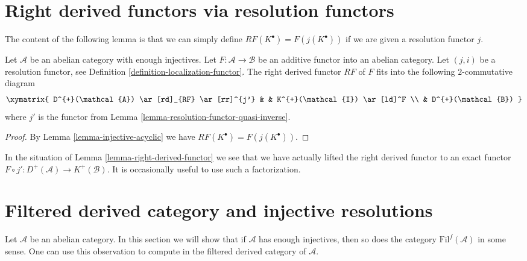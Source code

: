 \section{Right derived functors via resolution functors}
\label{section-right-derived-functor-via-resolutions}

\noindent
The content of the following lemma is that we can simply define
$RF(K^\bullet) = F(j(K^\bullet))$ if we are given a resolution functor $j$.

\begin{lemma}
\label{lemma-right-derived-functor}
Let $\mathcal{A}$ be an abelian category with enough injectives.
Let $F : \mathcal{A} \to \mathcal{B}$ be an additive functor into
an abelian category. Let $(j, i)$ be a resolution functor, see
Definition \ref{definition-localization-functor}.
The right derived functor $RF$ of $F$ fits into the following
$2$-commutative diagram
$$
\xymatrix{
D^{+}(\mathcal{A}) \ar[rd]_{RF} \ar[rr]^{j'} & &
K^{+}(\mathcal{I}) \ar[ld]^F \\
& D^{+}(\mathcal{B})
}
$$
where $j'$ is the functor from
Lemma \ref{lemma-resolution-functor-quasi-inverse}.
\end{lemma}

\begin{proof}
By
Lemma \ref{lemma-injective-acyclic}
we have $RF(K^\bullet) = F(j(K^\bullet))$.
\end{proof}

\begin{remark}
\label{remark-right-derived-functor}
In the situation of
Lemma \ref{lemma-right-derived-functor}
we see that we have actually lifted the right derived
functor to an exact functor
$F \circ j' : D^{+}(\mathcal{A}) \to K^{+}(\mathcal{B})$.
It is occasionally useful to use such a factorization.
\end{remark}








\section{Filtered derived category and injective resolutions}
\label{section-filtered-derived}

\noindent
Let $\mathcal{A}$ be an abelian category. In this section we will show
that if $\mathcal{A}$ has enough injectives, then so does
the category $\text{Fil}^f(\mathcal{A})$ in some sense. One
can use this observation to compute in the filtered derived category
of $\mathcal{A}$.

